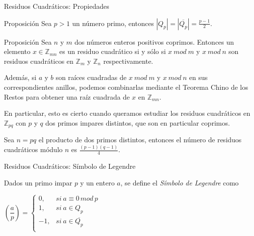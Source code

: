 \documentclass{beamer}
\begin{document}
\begin{frame}{Residuos Cuadráticos: Propiedades}
	\begin{block}{Proposición}
		Sea $p>1$ un n\'umero primo, entonces $|Q_p| = |\overline{Q_p}| = \frac{p-1}{2}$.
	\end{block}
	\begin{block}{Proposición}
		Sea $n$ y $m$ dos n\'umeros enteros positivos coprimos. Entonces un elemento
		$x \in {\mathbb Z}_{mn}$ es un residuo cuadr\'atico si y s\'olo si $x~mod~m$
		y $x~mod~n$ son residuos cuadr\'aticos en ${\mathbb Z}_m$ y ${\mathbb Z}_n$
		respectivamente.
		
		Adem\'as, si $a$ y $b$ son ra\'ices cuadradas de $x~mod~m$ y $x~mod~n$ en sus
		correspondientes anillos, podemos combinarlas mediante el Teorema Chino de los Restos
		para obtener una ra\'iz cuadrada de $x$ en ${\mathbb Z}_{mn}$.
		
		En particular, esto es cierto cuando queramos estudiar los residuos cuadr\'aticos en
		${\mathbb Z}_{pq}$ con $p$ y $q$ dos primos impares distintos, que son en particular coprimos.
	\end{block}
	\begin{corollary}
		Sea $n = pq$ el producto de dos primos distintos, entonces el n\'umero de residuos cuadr\'aticos m\'odulo $n$ es $\frac{(p-1)(q-1)}{4}$.
	\end{corollary}
\end{frame}


\begin{frame}{Residuos Cuadráticos: Símbolo de Legendre}
	\begin{definition}
		Dados un primo impar $p$ y un entero $a$, se define el {\em Símbolo de Legendre} como
		
		\begin{center}
			$
			\left( \dfrac{a}{p} \right) =
			\begin{cases}
			0, & si\ a \equiv 0 \, mod \, p\\
			1, & si\ a \in Q_p  \\
			-1, & si\ a \in \overline{Q_p} \\
			\end{cases}
			$
		\end{center}
	\end{definition}
\end{frame}
\end{document}
